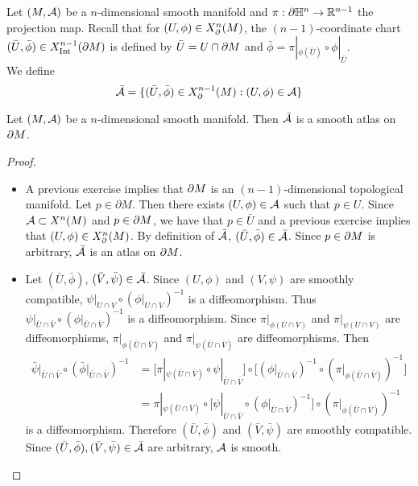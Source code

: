 \documentclass{book}
\begin{document}
\begin{defn} 
	Let $(M, \mathcal{A})$ be a $n$-dimensional smooth manifold and $\pi: \partial \mathbb{H}^n \rightarrow \mathbb{R}^{n-1}$ the projection map. Recall that for $(U, \phi) \in X^n_{\partial}(M)$, the $(n-1)$-coordinate chart $(\bar{U}, \bar{\phi}) \in X^{n-1}_{\operatorname{Int}}(\partial M)$ is defined by $\bar{U} = U \cap \partial M$ and $\bar{\phi} = \pi|_{\phi(\bar{U})} \circ \phi|_{\bar{U}}$. \\
	We define 
	$$\bar{\mathcal{A}} = \{(\bar{U}, \bar{\phi}) \in X^{n-1}_{\partial}(M): (U, \phi) \in \mathcal{A} \}$$
\end{defn}

\begin{ex}
	Let $(M, \mathcal{A})$ be a $n$-dimensional smooth manifold. Then $\bar{\mathcal{A}}$ is a smooth atlas on $\partial M$.
\end{ex}

\begin{proof}\
	\begin{itemize}
		\item A previous exercise implies that $\partial M$ is an $(n-1)$-dimensional topological manifold. Let $p \in \partial M$. Then there exists $(U, \phi) \in \mathcal{A}$ such that $p \in U$. Since $\mathcal{A} \subset X^n(M)$ and $p \in \partial M$, we have that $p \in \bar{U}$ and a previous exercise implies that $(U, \phi) \in X^n_{\partial}(M)$. By definition of $\bar{\mathcal{A}}$, $(\bar{U}, \bar{\phi}) \in \bar{\mathcal{A}}$. Since $p \in \partial M$ is arbitrary, $\bar{\mathcal{A}}$ is an atlas on $\partial M$. 
		
		
		\item Let $(\bar{U}, \bar{\phi})$, $(\bar{V}, \bar{\psi}) \in \bar{\mathcal{A}}$. Since $(U, \phi)$ and $(V, \psi)$ are smoothly compatible, $\psi|_{U \cap V} \circ (\phi|_{U \cap V})^{-1}$ is a diffeomorphism. Thus $\psi|_{\bar{U} \cap \bar{V}} \circ (\phi|_{\bar{U} \cap \bar{V}})^{-1}$ is a diffeomorphism. Since $\pi|_{\phi(U \cap V)}$ and $\pi|_{\psi(U \cap V)}$ are diffeomorphisms, $\pi|_{\phi(\bar{U} \cap \bar{V})}$ and $\pi|_{\psi(\bar{U} \cap \bar{V})}$ are diffeomorphisms. Then 
		\begin{align*}
			\bar{\psi}|_{\bar{U} \cap \bar{V}} \circ (\bar{\phi}|_{\bar{U} \cap \bar{V}})^{-1}
			& = \bigg[ \pi|_{\psi(\bar{U} \cap \bar{V})} \circ \psi|_{\bar{U} \cap \bar{V}} \bigg] \circ \bigg[ (\phi|_{\bar{U} \cap \bar{V}})^{-1} \circ( \pi|_{\phi(\bar{U} \cap \bar{V})})^{-1} \bigg] \\
			& =\pi|_{\psi(\bar{U} \cap \bar{V})} \circ \bigg[ \psi|_{\bar{U} \cap \bar{V}} \circ (\phi|_{\bar{U} \cap \bar{V}})^{-1} \bigg] \circ (\pi|_{\phi(\bar{U} \cap \bar{V})})^{-1}
		\end{align*}
		is a diffeomorphism. Therefore $(\bar{U}, \bar{\phi})$ and $(\bar{V}, \bar{\psi})$ are smoothly compatible. Since $(\bar{U}, \bar{\phi}), (\bar{V}, \bar{\psi}) \in \bar{\mathcal{A}}$ are arbitrary, $\mathcal{A}$ is smooth.
	\end{itemize}
\end{proof}
\end{document}
